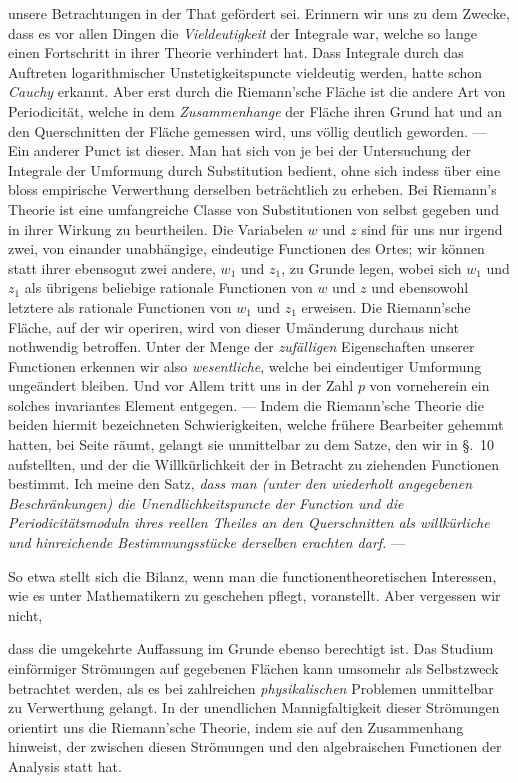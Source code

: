 \documentclass{article}
\begin{document}
unsere Betrachtungen in der That gefördert sei. Erinnern wir uns zu dem Zwecke, dass es vor allen Dingen die \emph{Vieldeutigkeit} der Integrale war, welche so lange einen Fortschritt in ihrer Theorie verhindert hat. Dass Integrale durch das Auftreten logarithmischer Unstetigkeitspuncte vieldeutig werden, hatte schon \emph{Cauchy} erkannt. Aber erst durch die Riemann'sche Fläche ist die andere Art von Periodicität, welche in dem \emph{Zusammenhange} der Fläche ihren Grund hat und an den Querschnitten der Fläche gemessen wird, uns völlig deutlich geworden. --- Ein anderer Punct ist dieser. Man hat sich von je bei der Untersuchung der Integrale der Umformung durch Substitution bedient, ohne sich indess über eine bloss empirische Verwerthung derselben beträchtlich zu erheben. Bei Riemann's Theorie ist eine umfangreiche Classe von Substitutionen von selbst gegeben und in ihrer Wirkung zu beurtheilen. Die Variabelen $w$ und $z$ sind für uns nur irgend zwei, von einander unabhängige, eindeutige Functionen des Ortes; wir können statt ihrer ebensogut zwei andere, $w_{1}$ und $z_{1}$, zu Grunde legen, wobei sich $w_{1}$ und $z_{1}$ als übrigens beliebige rationale Functionen von $w$ und $z$ und ebensowohl letztere als rationale Functionen von $w_{1}$ und $z_{1}$ erweisen. Die Riemann'sche Fläche, auf der wir operiren, wird von dieser Umänderung durchaus nicht nothwendig betroffen. Unter der Menge der \emph{zufälligen} Eigenschaften unserer Functionen erkennen wir also \emph{wesentliche}, welche bei eindeutiger Umformung ungeändert bleiben. Und vor Allem tritt uns in der Zahl $p$ von vorneherein ein solches invariantes Element entgegen. --- Indem die Riemann'sche Theorie die beiden hiermit bezeichneten Schwierigkeiten, welche frühere Bearbeiter gehemmt hatten, bei Seite räumt, gelangt sie unmittelbar zu dem Satze, den wir in §.~10 aufstellten, und der die Willkürlichkeit der in Betracht zu ziehenden Functionen bestimmt. Ich meine den Satz, \emph{dass man (unter den wiederholt angegebenen Beschränkungen) die Unendlichkeitspuncte der Function und die Periodicitätsmoduln ihres reellen Theiles an den Querschnitten als willkürliche und hinreichende Bestimmungsstücke derselben erachten darf.} ---

So etwa stellt sich die Bilanz, wenn man die functionentheoretischen Interessen, wie es unter Mathematikern zu geschehen pflegt, voranstellt. Aber vergessen wir nicht,

dass die umgekehrte Auffassung im Grunde ebenso berechtigt ist. Das Studium einförmiger Strömungen auf gegebenen Flächen kann umsomehr als Selbstzweck betrachtet werden, als es bei zahlreichen \emph{physikalischen} Problemen unmittelbar zu Verwerthung gelangt. In der unendlichen Mannigfaltigkeit dieser Strömungen orientirt uns die Riemann'sche Theorie, indem sie auf den Zusammenhang hinweist, der zwischen diesen Strömungen und den algebraischen Functionen der Analysis statt hat.
\end{document}
